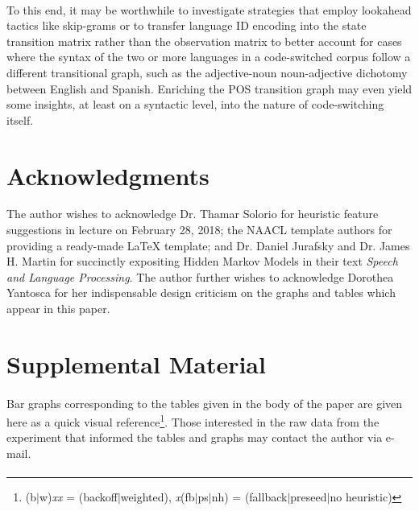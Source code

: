 \documentclass[11pt,a4paper]{article}
\begin{document}
\paragraph{}
To this end, it may be worthwhile to investigate strategies that employ lookahead tactics
like skip-grams or to transfer language ID encoding into the state transition matrix
rather than the observation matrix to better account for cases where the syntax of
the two or more languages in a code-switched corpus follow a different transitional graph,
such as the adjective-noun noun-adjective dichotomy between English and Spanish.
Enriching the POS transition graph may even yield some insights, at least on a syntactic
level, into the nature of code-switching itself.

\section*{Acknowledgments}

The author wishes to acknowledge Dr. Thamar Solorio for heuristic feature suggestions in
lecture on February 28, 2018; the NAACL template authors for providing a ready-made
{\LaTeX} template; and Dr. Daniel Jurafsky and Dr. James H. Martin for succinctly expositing
Hidden Markov Models in their text \emph{Speech and Language Processing}.
The author further wishes to acknowledge Dorothea Yantosca for her indispensable design criticism
on the graphs and tables which appear in this paper.




\appendix

\section{Supplemental Material}
\label{sec:supplemental}

\paragraph{}

Bar graphs corresponding to the tables given in the body of the paper are given
here as a quick visual reference\footnote{(b$|$w)\emph{xx} = (backoff$|$weighted), \emph{x}(fb$|$ps$|$nh) = (fallback$|$preseed$|$no heuristic)}.
Those interested in the raw data from the experiment that informed the tables and graphs may contact the author via e-mail.

\paragraph{}
\end{document}
